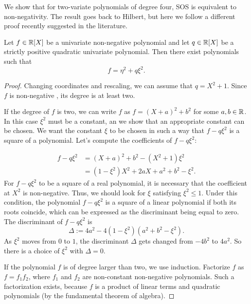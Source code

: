 We show that for two-variate polynomials of degree four, SOS is equivalent to non-negativity. The result goes back to Hilbert, but here we follow a different proof recently suggested in the literature. 

\begin{lemma}
	\label{ternary:quartics:lem}
	Let $f \in \mathbb{R}[X]$ be a univariate non-negative polynomial and let $q \in \mathbb{R}[X]$ be a strictly positive quadratic univariate polynomial. Then there exist polynomials \blue{$\eta, \xi \in \R[X]$} such that 
	\[
		f = \eta^2 + q \xi^2.
	\]
\end{lemma}
\begin{proof}
	Changing coordinates and rescaling, we can assume that $q = X^2 + 1$. Since $f$ is non-negative , its degree is at least two. 
	
	If the degree of $f$ is two, we can write $f$ as $f = (X+a)^2 + b^2$ for some $a,b \in \mathbb{R}$. In this case $\xi^2$ must be a constant, an we show that an appropriate constant can be chosen. We want the constant $\xi$ to be chosen in such a way that $f- q\xi^2$ is a square of a polynomial. Let's compute the coefficients of $f-q \xi^2$:
	
	\begin{align*}
		f - q \xi^2 & = (X+a)^2 + b^2 - (X^2 + 1) \xi^2 
		\\ & = (1-\xi^2) X^2 + 2 a X + a^2 + b^2 - \xi^2.
	\end{align*}
	For $f-q \xi^2$ to be a square of a real polynomial, it is necessary that the coefficient at $X^2$ is non-negative. Thus, we should look for $\xi$ satisfying  $\xi^2 \le 1$. Under this condition, the polynomial $f- q \xi^2$ is a square of a linear polynomial if both its roots coincide, which can be expressed as the discriminant being equal to zero. The discriminant of $f - q \xi^2$ is 
	\[
		\Delta := 4 a^2 - 4 (1-\xi^2) (a^2 + b^2 -\xi^2).
	\] 
	As $\xi^2$ moves from $0$ to $1$, the discriminant $\Delta$ gets changed from $- 4 b^2$ to $4 a^2$. So there is a choice of $\xi^2$ with $\Delta=0$. 
	
	If the polynomial $f$ is of degree larger than two, we use induction. Factorize $f$ as $f=f_1 f_2$, where $f_1$ and $f_2$ are non-constant non-negative polynomials. Such a factorization exists, because $f$ is a product of linear terms and quadratic polynomials (by the fundamental theorem of algebra).
	

\end{proof}
